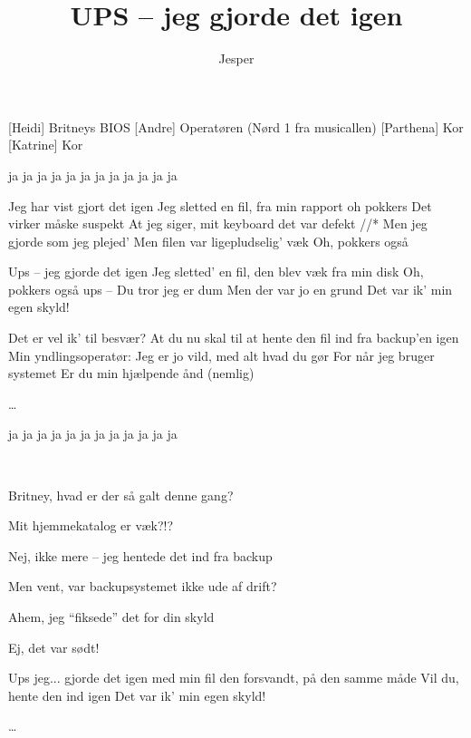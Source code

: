 \documentclass[danish]{article}
\title{UPS -- jeg gjorde det igen}
\author{Jesper}
\begin{document}
\maketitle

\begin{roles}
  [Heidi] Britneys BIOS
  [Andre] Operatøren (Nørd 1 fra musicallen)
  [Parthena] Kor
  [Katrine] Kor
\end{roles}


\begin{song}

 ja ja ja ja ja ja
ja ja ja ja ja ja

 Jeg har vist gjort det igen
Jeg sletted en fil, fra min rapport
oh pokkers
Det virker måske suspekt
At jeg siger, mit keyboard det var defekt //*
Men jeg gjorde som jeg plejed'
Men filen var ligepludselig' væk
Oh, pokkers også

 Ups -- jeg gjorde det igen
Jeg sletted' en fil, den blev væk fra min disk
Oh, pokkers også
ups -- Du tror jeg er dum
Men der var jo en grund
Det var ik' min egen skyld!

 Det er vel ik' til besvær?
At du nu skal til
at hente den fil ind fra backup'en igen
Min yndlingsoperatør:
Jeg er jo vild, med alt hvad du gør
For når jeg bruger systemet
Er du min hjælpende ånd
(nemlig)

 \ldots

 ja ja ja ja ja ja
ja ja ja ja ja ja

~

 Britney, hvad er der så galt denne gang?

 Mit hjemmekatalog er væk?!?

 Nej, ikke mere -- jeg hentede det ind fra backup

 Men vent, var backupsystemet ikke ude af drift?

 Ahem, jeg ``fiksede'' det for din skyld

 Ej, det var sødt!

 Ups jeg...
gjorde det igen med min fil
den forsvandt, på den samme måde                                                                                            
Vil du, hente den ind igen
Det var ik' min egen skyld!

 \ldots


\end{song}
\end{document}
